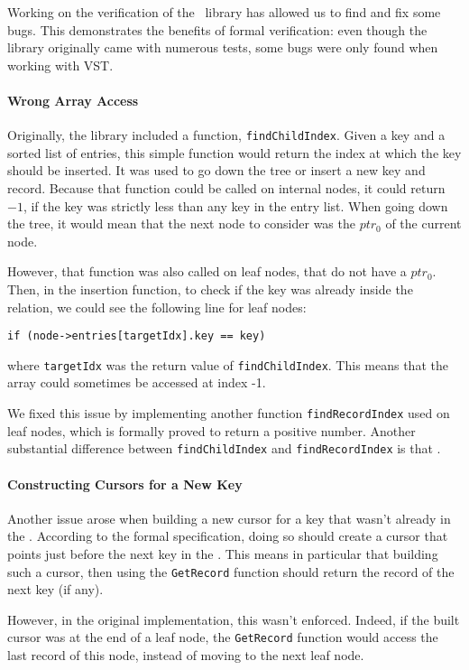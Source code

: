 Working on the verification of the \btrees\ library has allowed us to find and fix some bugs.
This demonstrates the benefits of formal verification: even though the library originally came with numerous tests, some bugs were only found when working with VST.

\paragraph{Wrong Array Access} Originally, the library included a function, \lstinline{findChildIndex}.
Given a key and a sorted list of entries, this simple function would return the index at which the key should be inserted.
It was used to go down the tree or insert a new key and record.
Because that function could be called on internal nodes, it could return $-1$, if the key was strictly less than any key in the entry list.
When going down the tree, it would mean that the next node to consider was the $ptr_0$ of the current node.

However, that function was also called on leaf nodes, that do not have a $ptr_0$.
Then, in the insertion function, to check if the key was already inside the relation, we could see the following line for leaf nodes:
\begin{lstlisting}
if (node->entries[targetIdx].key == key)
\end{lstlisting}
where \lstinline{targetIdx} was the return value of \lstinline{findChildIndex}.
This means that the array could sometimes be accessed at index -1.

We fixed this issue by implementing another function \lstinline{findRecordIndex} used on leaf nodes, which is formally proved to return a positive number.
Another substantial difference between \lstinline{findChildIndex} and \lstinline{findRecordIndex} is that .

\paragraph{Constructing Cursors for a New Key}
Another issue arose when building a new cursor for a key that wasn't already in the \btree.
According to the formal specification, doing so should create a cursor that points just before the next key in the \btree.
This means in particular that building such a cursor, then using the \lstinline{GetRecord} function should return the record of the next key (if any).

However, in the original implementation, this wasn't enforced.
Indeed, if the built cursor was at the end of a leaf node, the \lstinline{GetRecord} function would access the last record of this node, instead of moving to the next leaf node.

